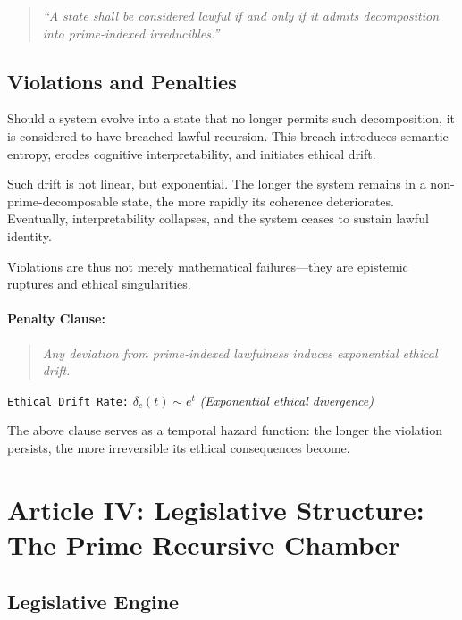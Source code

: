 \documentclass[12]{amsart}
\theoremstyle{plain}
\begin{document}
\begin{quote}
\textit{“A state shall be considered lawful if and only if it admits decomposition into prime-indexed irreducibles.”}
\end{quote}

\subsection{Violations and Penalties}

Should a system evolve into a state that no longer permits such decomposition, it is considered to have breached lawful recursion. This breach introduces semantic entropy, erodes cognitive interpretability, and initiates ethical drift.

Such drift is not linear, but exponential. The longer the system remains in a non-prime-decomposable state, the more rapidly its coherence deteriorates. Eventually, interpretability collapses, and the system ceases to sustain lawful identity.

Violations are thus not merely mathematical failures—they are epistemic ruptures and ethical singularities.

\paragraph{Penalty Clause:}
\begin{quote}
\textit{Any deviation from prime-indexed lawfulness induces exponential ethical drift.}
\end{quote}

\vspace{-0.5em}
\begin{center}
\texttt{Ethical Drift Rate:} \quad $\delta_c(t) \sim e^t$ \quad \textit{(Exponential ethical divergence)}
\end{center}

\noindent The above clause serves as a temporal hazard function: the longer the violation persists, the more irreversible its ethical consequences become.


\section{Article IV: Legislative Structure: The Prime Recursive Chamber}

\subsection{Legislative Engine}
\end{document}

